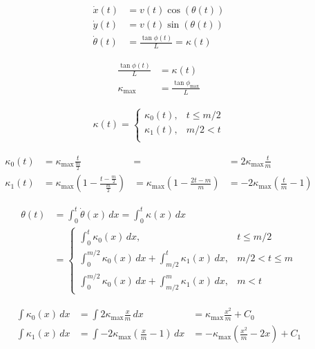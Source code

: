 \documentclass{article}
\begin{document}
\begin{align}
  \dot{x}\left(t\right) &= v\left(t\right)\cos\left(\theta\left(t\right)\right)\\
  \dot{y}\left(t\right) &= v\left(t\right)\sin\left(\theta\left(t\right)\right)\\
  \dot{\theta}\left(t\right) &= \frac{\tan \phi\left(t\right)}{L} = \kappa\left(t\right)
\end{align}

\begin{align}
  \frac{\tan \phi\left(t\right)}{L} &= \kappa\left(t\right)\\
  \kappa_{\max} &= \frac{\tan \phi_{\max}}{L}
\end{align}

\begin{align}
  \kappa\left(t\right) = \left\{
    \begin{array}{cc}
      \kappa_{0}\left(t\right),   & t \le m/2\\
      \kappa_{1}\left(t\right), & m/2 < t\\
    \end{array}
  \right.
\end{align}

\begin{align}
  \kappa_{0}\left(t\right) &= \kappa_{\max}\frac{t}{\frac{m}{2}} &= &=2\kappa_{\max}\frac{t}{m}\\
  \kappa_{1}\left(t\right) &= \kappa_{\max}\left(1-\frac{t-\frac{m}{2}}{\frac{m}{2}}\right) &= \kappa_{\max}\left(1-\frac{2t-m}{m}\right) &= -2\kappa_{\max}\left(\frac{t}{m}-1\right)\end{align}

\begin{align}
  \theta\left(t\right) &= \int_0^t \dot{\theta}\left(x\right)\,dx = \int_0^t \kappa\left(x\right)\,dx\\
  &= \left\{
    \begin{array}{cc}
      \int_0^t \kappa_{0}\left(x\right)\,dx,   & t \le m/2\\
      \int_0^{m/2} \kappa_{0}\left(x\right)\,dx + \int_{m/2}^t \kappa_{1}\left(x\right)\,dx, & m/2 < t \le m\\
      \int_0^{m/2} \kappa_{0}\left(x\right)\,dx + \int_{m/2}^m \kappa_{1}\left(x\right)\,dx, & m < t
    \end{array}
  \right.
\end{align}

\begin{align}
  \int \kappa_{0}\left(x\right)\,dx &= \int 2\kappa_{\max}\frac{x}{m}\,dx &= \kappa_{\max}\frac{x^{2}}{m} + C_{0}\\
  \int \kappa_{1}\left(x\right)\,dx &= \int -2\kappa_{\max}\left(\frac{x}{m}-1\right)\,dx &= -\kappa_{\max}\left(\frac{x^{2}}{m}-2x\right) + C_{1}
\end{align}
\end{document}
